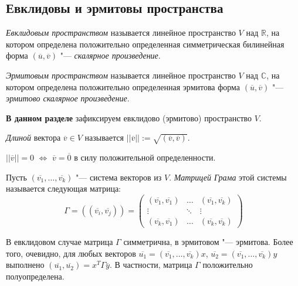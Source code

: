 \subsection{Евклидовы и эрмитовы пространства}

\begin{definition}
	\textit{Евклидовым пространством} называется линейное пространство $V$ над $\mathbb{R}$, на котором определена положительно определенная симметрическая билинейная форма $(\overline{u}, \overline{v})$ "--- \textit{скалярное произведение}.
\end{definition}

\begin{definition}
	\textit{Эрмитовым пространством} называется линейное пространство $V$ над $\mathbb{C}$, на котором определена положительно определенная эрмитова форма $(\overline{u}, \overline{v})$ "--- \textit{эрмитово скалярное произведение}.
\end{definition}

\textbf{В данном разделе} зафиксируем евклидово (эрмитово) пространство $V$.

\begin{definition}
	\textit{Длиной} вектора $\overline{v} \in V$ называется $||\overline{v}|| := \sqrt{(\overline{v}, \overline{v})}$.
\end{definition}

\begin{note}
	$||\overline{v}|| = 0$ $\Leftrightarrow$ $\overline{v} = \overline{0}$ в силу положительной определенности.
\end{note}

\begin{definition}
	Пусть $(\overline{v_1}, \dots, \overline{v_k})$ "--- система векторов из $V$. \textit{Матрицей Грама} этой системы называется следующая матрица:
	\[\Gamma = ((\overline{v_i}, \overline{v_j})) = \begin{pmatrix}(\overline{v_1}, \overline{v_1}) & \dots & (\overline{v_1}, \overline{v_k})\\
		\vdots & \ddots & \vdots\\
		(\overline{v_k}, \overline{v_1}) & \dots & (\overline{v_k}, \overline{v_k})
	\end{pmatrix}\]
\end{definition}

\begin{note}
	В евклидовом случае матрица $\Gamma$ симметрична, в эрмитовом "--- эрмитова. Более того, очевидно, для любых векторов $\overline{u_1} = (\overline{v_1}, \dots, \overline{v_k})x$, $\overline{u_2} = (\overline{v_1}, \dots, \overline{v_k})y$ выполнено $(\overline{u_1}, \overline{u_2}) = x^T\Gamma \overline{y}$. В частности, матрица $\Gamma$ положительно полуопределена.
\end{note}

